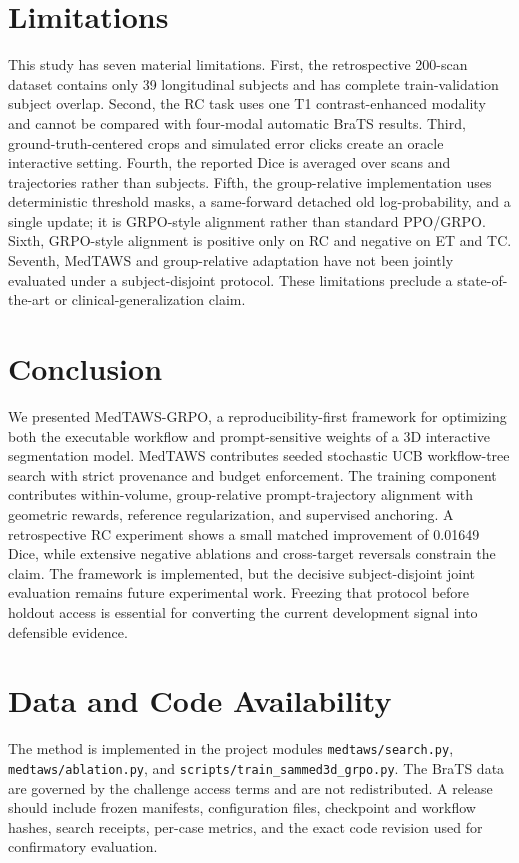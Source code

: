 \documentclass[10pt]{article}
\begin{document}
\section{Limitations}
This study has seven material limitations. First, the retrospective 200-scan dataset contains only 39 longitudinal subjects and has complete train-validation subject overlap. Second, the RC task uses one T1 contrast-enhanced modality and cannot be compared with four-modal automatic BraTS results. Third, ground-truth-centered crops and simulated error clicks create an oracle interactive setting. Fourth, the reported Dice is averaged over scans and trajectories rather than subjects. Fifth, the group-relative implementation uses deterministic threshold masks, a same-forward detached old log-probability, and a single update; it is GRPO-style alignment rather than standard PPO/GRPO. Sixth, GRPO-style alignment is positive only on RC and negative on ET and TC. Seventh, MedTAWS and group-relative adaptation have not been jointly evaluated under a subject-disjoint protocol. These limitations preclude a state-of-the-art or clinical-generalization claim.

\section{Conclusion}
We presented MedTAWS-GRPO, a reproducibility-first framework for optimizing both the executable workflow and prompt-sensitive weights of a 3D interactive segmentation model. MedTAWS contributes seeded stochastic UCB workflow-tree search with strict provenance and budget enforcement. The training component contributes within-volume, group-relative prompt-trajectory alignment with geometric rewards, reference regularization, and supervised anchoring. A retrospective RC experiment shows a small matched improvement of 0.01649 Dice, while extensive negative ablations and cross-target reversals constrain the claim. The framework is implemented, but the decisive subject-disjoint joint evaluation remains future experimental work. Freezing that protocol before holdout access is essential for converting the current development signal into defensible evidence.

\section{Data and Code Availability}
The method is implemented in the project modules \texttt{medtaws/search.py}, \texttt{medtaws/ablation.py}, and \texttt{scripts/train\_sammed3d\_grpo.py}. The BraTS data are governed by the challenge access terms and are not redistributed. A release should include frozen manifests, configuration files, checkpoint and workflow hashes, search receipts, per-case metrics, and the exact code revision used for confirmatory evaluation.



\end{document}

